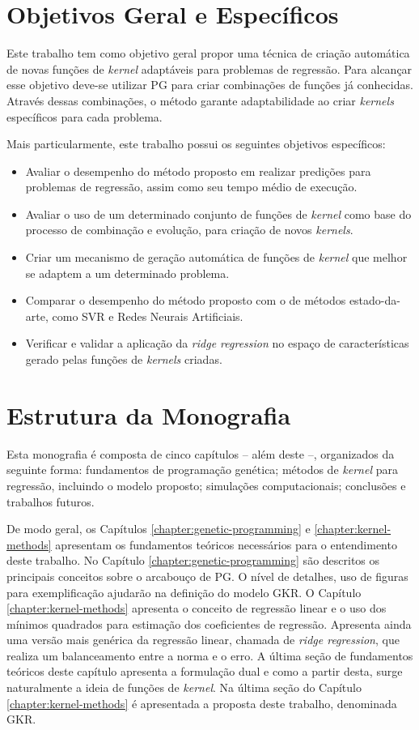 \section{Objetivos Geral e Específicos}
Este trabalho tem como objetivo geral propor uma técnica de criação automática de novas funções de \textit{kernel} adaptáveis para problemas de regressão. Para alcançar esse objetivo deve-se utilizar PG para criar combinações de funções já conhecidas. Através dessas combinações, o método garante adaptabilidade ao criar \textit{kernels} específicos para cada problema.

Mais particularmente, este trabalho possui os seguintes objetivos específicos:

\begin{itemize}
	\item Avaliar o desempenho do método proposto em realizar predições para problemas de regressão, assim como seu tempo médio de execução.
    \item Avaliar o uso de um determinado conjunto de funções de \textit{kernel} como base do processo de combinação e evolução, para criação de novos \textit{kernels}.
    \item Criar um mecanismo de geração automática de funções de \textit{kernel} que melhor se adaptem a um determinado problema.
    \item Comparar o desempenho do método proposto com o de métodos estado-da-arte, como SVR e Redes Neurais Artificiais.
    \item Verificar e validar a aplicação da \textit{ridge regression} no espaço de características gerado pelas funções de \textit{kernels} criadas.
\end{itemize}

\section{Estrutura da Monografia}
Esta monografia é composta de cinco capítulos -- além deste --, organizados da seguinte forma: fundamentos de programação genética; métodos de \textit{kernel} para regressão, incluindo o modelo proposto; simulações computacionais; conclusões e trabalhos futuros.

De modo geral, os Capítulos \ref{chapter:genetic-programming} e \ref{chapter:kernel-methods} apresentam os fundamentos teóricos necessários para o entendimento deste trabalho. No Capítulo \ref{chapter:genetic-programming} são descritos os principais conceitos sobre o arcabouço de PG. O nível de detalhes, uso de figuras para exemplificação ajudarão na definição do modelo GKR. O Capítulo \ref{chapter:kernel-methods} apresenta o conceito de regressão linear e o uso dos mínimos quadrados para estimação dos coeficientes de regressão. Apresenta ainda uma versão mais genérica da regressão linear, chamada de \textit{ridge regression}, que realiza um balanceamento entre a norma e o erro. A última seção de fundamentos teóricos deste capítulo apresenta a formulação dual e como a partir desta, surge naturalmente a ideia de funções de \textit{kernel}. Na última seção do Capítulo \ref{chapter:kernel-methods} é apresentada a proposta deste trabalho, denominada GKR.

